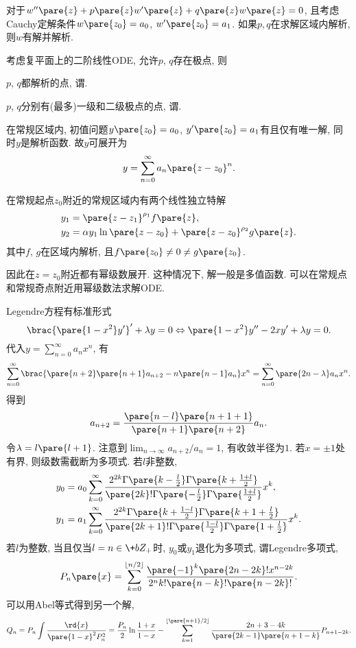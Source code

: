 \documentclass[hidelinks]{ctexart}
\begin{document}
对于$w''\pare{z} + p\pare{z} w'\pare{z} + q\pare{z}w\pare{z} = 0$, 且考虑Cauchy定解条件$w\pare{z_0} = a_0$, $w'\pare{z_0} = a_1$. 如果$p,q$在求解区域内解析, 则$w$有解并解析.
\par
考虑复平面上的二阶线性ODE, 允许$p$, $q$存在极点, 则
\begin{cenum}
    \item $p$, $q$都解析的点, 谓.
    \item $p$, $q$分别有(最多)一级和二级极点的点, 谓.
\end{cenum}
\begin{theorem}[Cauchy]
    在常规区域内, 初值问题$y\pare{z_0} = a_0$, $y'\pare{z_0} = a_1$有且仅有唯一解, 同时$y$是解析函数. 故$y$可展开为
    \[ y = \sum_{n=0}^\infty a_n\pare{z-z_0}^n. \]
\end{theorem}
\begin{theorem}[Fuchs]
    在常规起点$z_0$附近的常规区域内有两个线性独立特解
    \begin{align*}
        y_1 &= \pare{z-z_1}^{\rho_1} f\pare{z}, \\
        y_2 &= \alpha y_1 \ln\pare{z-z_0} + \pare{z-z_0}^{\rho_2} g\pare{z}.
    \end{align*}
    其中$f$, $g$在区域内解析, 且$f\pare{z_0} \neq 0 \neq g\pare{z_0}$.
\end{theorem}
因此在$z=z_0$附近都有幂级数展开.
\newpoint{}这种情况下, 解一般是多值函数.
\newpoint{}可以在常规点和常规奇点附近用幂级数法求解ODE.
\begin{ex}
    Legendre方程有标准形式
    \[ \brac{\pare{1-x^2}y'}' + \lambda y = 0 \Leftrightarrow \pare{1-x^2}y'' - 2xy' + \lambda y = 0. \]
    代入$\displaystyle y = \sum_{n=0}^\infty a_n x^n$, 有
    \[ \sum_{n=0}^\infty \brac{\pare{n+2}\pare{n+1}a_{n+2} - n\pare{n-1}a_n}x^n = \sum_{n=0}^\infty \pare{2n-\lambda} a_n x^n. \]
    得到
    \[ a_{n+2} = \frac{\pare{n-l}\pare{n+1+1}}{\pare{n+1}\pare{n+2}} a_n. \]
    令$\lambda = l\pare{l+1}$. 注意到$\displaystyle \lim_{n\rightarrow \infty} a_{n+2}/a_n = 1$, 有收敛半径为$1$. 若$x=\pm 1$处有界, 则级数需截断为多项式. 若$l$非整数,
    \begin{align*}
        y_0 &= a_0 \sum_{k=0}^\infty \frac{2^{2k}\Gamma\pare{k-\frac{l}{2}} \Gamma\pare{k+\frac{1+l}{2}}}{\pare{2k}! \Gamma\pare{-\frac{l}{2}}\Gamma\pare{\frac{1+l}{2}}}x^k, \\
        y_1 &= a_1 \sum_{k=0}^\infty \frac{2^{2k}\Gamma\pare{k+\frac{1-l}{2}} \Gamma\pare{k+1+\frac{l}{2}}}{\pare{2k+1}! \Gamma\pare{\frac{1-l}{2}} \Gamma\pare{1+\frac{l}{2}}}x^k.
    \end{align*}
    若$l$为整数, 当且仅当$l=n\in \+bZ_+$时, $y_0$或$y_1$退化为多项式, 谓Legendre多项式,
    \[ P_n\pare{x} = \sum_{k=0}^{\lfloor n/2\rfloor} \frac{\pare{-1}^k \pare{2n-2k}!x^{n-2k}}{2^n k! \pare{n-k}! \pare{n-2k}!}. \]
    可以用Abel等式得到另一个解,
    \begin{align*}
        Q_n = P_n \int \frac{\rd{x}}{\pare{1-x}^2 P_n^2} = \frac{P_n}{2}\ln \frac{1+x}{1-x} - \sum_{k=1}^{\lfloor \pare{n+1}/2\rfloor} \frac{2n+3-4k}{\pare{2k-1}\pare{n+1-k}}P_{n+1-2k}.
    \end{align*}
\end{ex}
\end{document}
